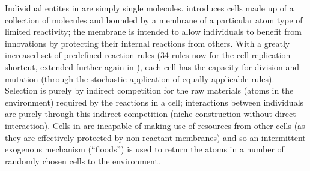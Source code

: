 \begin{NOTES}
Individual entites in \cite{Hutton2002} are simply single molecules. \Cite{Hutton2007} introduces cells made up of a collection of molecules and bounded by a membrane of a particular atom type of limited reactivity; the membrane is intended to allow individuals to benefit from innovations by protecting their internal reactions from others. With a greatly increased set of predefined reaction rules (34 rules now for the cell replication shortcut, extended further again in \cite{Lucht2012}), each cell has the capacity for division and mutation (through the stochastic application of equally applicable rules).  Selection is purely by indirect competition for the raw materials (atoms in the environment) required by the reactions in a cell; interactions between individuals are purely through this indirect competition (niche construction without direct interaction). Cells in \cite{Hutton2007} are incapable of making use of resources from other cells (as they are effectively protected by non-reactant membranes) and so an intermittent exogenous mechanism (``floods'') is used to return the atoms in a number of randomly chosen cells to the environment.

\end{NOTES}

